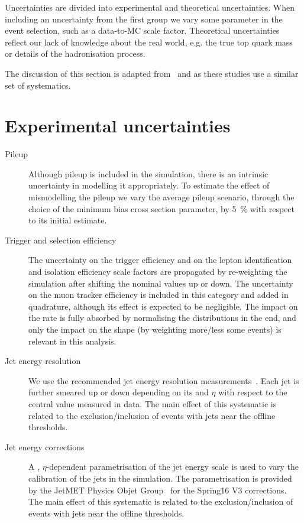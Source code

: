 Uncertainties are divided into experimental and theoretical uncertainties. When including an uncertainty from the first group we vary some parameter in the event selection, such as a data-to-MC scale factor. Theoretical uncertainties reflect our lack of knowledge about the real world, e.g. the true top quark mass or details of the hadronisation process.

The discussion of this section is adapted from~\cite{CMS-AN-2017-175} and \cite{CMS-AN-2017-159} as these studies use a similar set of systematics.

\section{Experimental uncertainties}
\begin{description}
\item[Pileup] Although pileup is included in the simulation, there is an intrinsic uncertainty in modelling it appropriately. To estimate the effect of mismodelling the pileup we vary the average pileup scenario, through the choice of the minimum bias cross section parameter, by 5~\% with respect to its initial estimate. 

\item[Trigger and selection efficiency] The uncertainty on the trigger efficiency and on the lepton identification and isolation efficiency scale factors are propagated by re-weighting the simulation after shifting the nominal values up or down. The uncertainty on the muon tracker efficiency is included in this category and added in quadrature, although its effect is expected to be negligible.  The impact on the rate is fully absorbed by normalising the distributions in the end, and only the impact on the shape (by weighting more/less some events) is relevant in this analysis.

\item[Jet energy resolution] We use the recommended jet energy resolution measurements~\cite{twiki:JER}. Each jet is further smeared up or down depending on its \pt and $\eta$ with respect to the central value measured in data. The main effect of this systematic is related to the exclusion/inclusion of events with jets near the offline thresholds.
  
\item[Jet energy corrections] A \pt, $\eta$-dependent parametrisation of the jet energy scale is used to vary the calibration of the jets in the simulation. The parametrisation is provided by the JetMET Physics Objet Group~\cite{twiki:JES} for the Spring16 V3 corrections. The main effect of this systematic is related to the exclusion/inclusion of events with jets near the offline thresholds.


\end{description}
